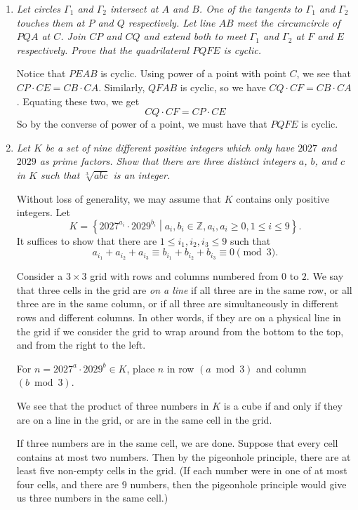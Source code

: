 \documentclass{article}
\begin{document}
\begin{enumerate}[1.]
  
  \item %
  {\itshape Let circles $\Gamma_1$ and $\Gamma_2$ intersect at $A$ and $B$. One of the tangents to $\Gamma_1$ and $\Gamma_2$ touches them at $P$ and $Q$ respectively. Let line $AB$ meet the circumcircle of $PQA$ at $C$. Join $CP$ and $CQ$ and extend both to meet $\Gamma_1$ and $\Gamma_2$ at $F$ and $E$ respectively. Prove that the quadrilateral $PQFE$ is cyclic.}
  
  Notice that $PEAB$ is cyclic. Using power of a point with point $C$, we see that $CP \cdot CE = CB \cdot CA$. Similarly, $QFAB$ is cyclic, so we have $CQ \cdot CF = CB \cdot CA$. Equating these two, we get 
  $$CQ \cdot CF = CP \cdot CE $$
  So by the converse of power of a point, we must have that $PQFE$ is cyclic.
  
  \item %
  {\itshape Let $K$ be a set of nine different positive integers which only have $2027$ and $2029$ as prime factors.
  Show that there are three distinct integers $a$, $b$, and $c$ in $K$ such that $\sqrt[3]{abc}$ is an integer.}

  Without loss of generality, we may assume that $K$ contains only positive integers. Let
  \[
    K = \left\{ 2027^{a_i} \cdot 2029^{b_i} \middle| a_i, b_i \in \mathbb{Z}, a_i, a_i \geq 0, 1 \leq i \leq 9 \right\}.
  \]
  It suffices to show that there are $1 \leq i_1, i_2, i_3 \leq 9$ such that
  \[
    a_{i_1} + a_{i_2} + a_{i_3} \equiv b_{i_1} + b_{i_2} + b_{i_3} \equiv 0 \pmod 3.  
  \]

  Consider a $3 \times 3$ grid with rows and columns numbered from $0$ to $2$. We say that three cells in the grid are \emph{on a line} if all three are in the same row, or all three are in the same column, or if all three are simultaneously in different rows and different columns. In other words, if they are on a physical line in the grid if we consider the grid to wrap around from the bottom to the top, and from the right to the left.
  
  For $n = 2027^a \cdot 2029^b \in K$, place $n$ in row $(a \bmod 3)$ and column $(b \bmod 3)$.

  We see that the product of three numbers in $K$ is a cube if and only if they are on a line in the grid, or are in the same cell in the grid.

  If three numbers are in the same cell, we are done. Suppose that every cell contains at most two numbers. Then by the pigeonhole principle, there are at least five non-empty cells in the grid. (If each number were in one of at most four cells, and there are $9$ numbers, then the pigeonhole principle would give us three numbers in the same cell.)


\end{enumerate}
\end{document}
